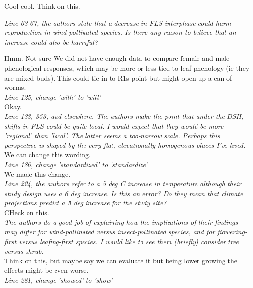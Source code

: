\documentclass[11pt]{article}
\begin{document}
Cool cool. Think on this.

\emph{Line 63-67, the authors state that a decrease in FLS interphase could harm reproduction in wind-pollinated species. Is there any reason to believe that an increase could also be harmful?}

Hmm. Not sure We did not have enough data to compare female and male phenological responses, which may be more or less tied to leaf phenology (ie they are mixed buds). This could tie in to R1s point but might open up a can of worms.\\

\emph{Line 125, change 'with' to 'will'}\\

Okay.\\


\emph{Line 133, 353, and elsewhere. The authors make the point that under the DSH, shifts in FLS could be quite local. I would expect that they would be more 'regional' than 'local'. The latter seems a too-narrow scale. Perhaps this perspective is shaped by the very flat, elevationally homogenous places I've lived.}\\

We can change this wording.\\

\emph{Line 186, change 'standardized' to 'standardize'}\\

We made this change.\\


\emph{Line 224, the authors refer to a 5 deg C increase in temperature although their study design uses a 6 deg increase. Is this an error? Do they mean that climate projections predict a 5 deg increase for the study site?}\\

CHeck on this.\\

\emph{The authors do a good job of explaining how the implications of their findings may differ for wind-pollinated versus insect-pollinated species, and for flowering-first versus leafing-first species. I would like to see them (briefly) consider tree versus shrub.}\\

Think on this, but maybe say we can evaluate it but being lower growing the effects might be even worse.\\

\emph{Line 281, change 'showed' to 'show'}\\
\end{document}
